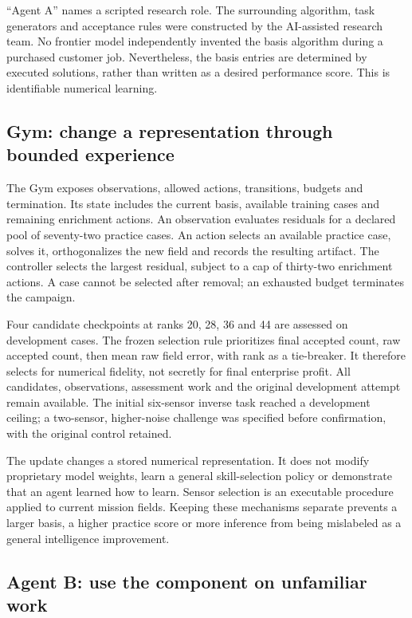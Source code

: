 \documentclass[11pt,letterpaper]{article}
\begin{document}
``Agent A'' names a scripted research role. The surrounding algorithm, task generators and acceptance rules were constructed by the AI-assisted research team. No frontier model independently invented the basis algorithm during a purchased customer job. Nevertheless, the basis entries are determined by executed solutions, rather than written as a desired performance score. This is identifiable numerical learning.

\subsection{Gym: change a representation through bounded experience}

The Gym exposes observations, allowed actions, transitions, budgets and termination. Its state includes the current basis, available training cases and remaining enrichment actions. An observation evaluates residuals for a declared pool of seventy-two practice cases. An action selects an available practice case, solves it, orthogonalizes the new field and records the resulting artifact. The controller selects the largest residual, subject to a cap of thirty-two enrichment actions. A case cannot be selected after removal; an exhausted budget terminates the campaign.

Four candidate checkpoints at ranks 20, 28, 36 and 44 are assessed on development cases. The frozen selection rule prioritizes final accepted count, raw accepted count, then mean raw field error, with rank as a tie-breaker. It therefore selects for numerical fidelity, not secretly for final enterprise profit. All candidates, observations, assessment work and the original development attempt remain available. The initial six-sensor inverse task reached a development ceiling; a two-sensor, higher-noise challenge was specified before confirmation, with the original control retained.

The update changes a stored numerical representation. It does not modify proprietary model weights, learn a general skill-selection policy or demonstrate that an agent learned how to learn. Sensor selection is an executable procedure applied to current mission fields. Keeping these mechanisms separate prevents a larger basis, a higher practice score or more inference from being mislabeled as a general intelligence improvement.

\subsection{Agent B: use the component on unfamiliar work}
\end{document}
